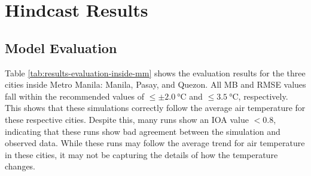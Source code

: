 \section{Hindcast Results}
	\subsection{Model Evaluation}
		Table \ref{tab:results-evaluation-inside-mm} shows the evaluation results for the three cities inside Metro Manila: Manila, Pasay, and Quezon.
		All MB and RMSE values fall within the recommended values of $\leq \pm \qty{2.0}{\degreeCelsius}$ and $\leq \qty{3.5}{\degreeCelsius}$, respectively.
		This shows that these simulations correctly follow the average air temperature for these respective cities.
		Despite this, many runs show an IOA value $< 0.8$, indicating that these runs show bad agreement between the simulation and observed data.
		While these runs may follow the average trend for air temperature in these cities, it may not be capturing the details of how the temperature changes.
		
